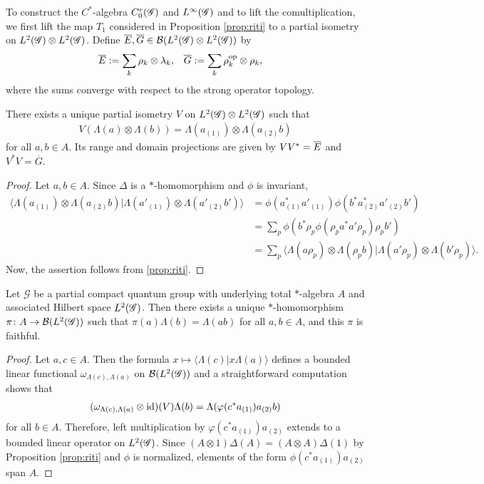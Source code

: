 To construct the $C^{*}$-algebra $C^{r}_{0}(\mathscr{G})$ and $L^{\infty}(\mathscr{G})$ and to lift the
comultiplication, we first lift the map $T_{1}$ considered in
Proposition \ref{prop:riti} to a partial isometry on $L^{2}(\mathscr{G}) \otimes
L^{2}(\mathscr{G})$.  Define $\overline{E},\overline{G} \in {\cal B}(L^{2}(\mathscr{G}) \otimes
L^{2}(\mathscr{G}))$ by
\begin{align*}
  \overline{E} &:=\sum_{k} \rho_{k} \otimes \lambda_{k}, & 
  \overline{G} &:= \sum_{k} \rho_{k}^{\operatorname{\mathrm{op}}} \otimes \rho_{k},
\end{align*}
where the sums converge with respect to the strong operator
topology.
\begin{Lem} \label{lemma:partial-isometry}
There exists a unique partial isometry $V$ on $L^{2}(\mathscr{G}) \otimes L^{2}(\mathscr{G})$
such that
\begin{align*}
  V(\Lambda(a) \otimes \Lambda(b)) = \Lambda(a_{(1)}) \otimes \Lambda(a_{(2)}b)
\end{align*}
for all $a,b\in A$. Its range and domain projections are given by $VV^{*} = \overline{E}$
and $V^{*}V = \overline{G}$.
\end{Lem}
\begin{proof}
  Let $a,b \in A$. Since $\Delta$ is a $*$-homomorphism and $\phi$ is
invariant,
  \begin{align*}
    \langle \Lambda(a_{(1)}) \otimes
    \Lambda(a_{(2)}b)|\Lambda(a'_{(1)}) \otimes
    \Lambda(a'_{(2)}b')\rangle &=
    \phi(a_{(1)}^{*}a'_{(1)})\phi(b^{*}a_{(2)}^{*}a'_{(2)}b') \\
    &= \sum_{p}
    \phi(b^{*}\rho_{p}\phi(\rho_{p}a^{*}a'\rho_{p})\rho_{p}b') \\
    & =\sum_{p} \langle\Lambda(a\rho_{p}) \otimes \Lambda(\rho_{p}b) |
    \Lambda(a'\rho_{p}) \otimes \Lambda(b'\rho_{p})\rangle.
  \end{align*}
  Now, the assertion follows from \ref{prop:riti}.
\end{proof}

\begin{Prop} \label{prop:gns} Let $\mathscr{G}$ be a partial compact quantum group with
  underlying total $*$-algebra $A$ and associated Hilbert
  space $L^{2}(\mathscr{G})$. Then there exists a unique $*$-homomorphism $\pi\colon
  A \to {\cal B}(L^{2}(\mathscr{G}))$ such that $\pi(a)\Lambda(b)=\Lambda(ab)$ for
  all $a,b\in A$, and this $\pi$ is faithful.
\end{Prop}
\begin{proof} 
  Let $a,c \in A$. Then the formula $x \mapsto \langle
\Lambda(c) | x\Lambda(a)\rangle$ defines a bounded linear functional
  $\omega_{\Lambda(c),\Lambda(a)}$ on ${\cal B}(L^{2}(\mathscr{G}))$ and a
  straightforward computation shows that
  \begin{align*}
    (\omega_{\Lambda(c),\Lambda(a)}\otimes \operatorname{id})(V)\Lambda(b) =
    \Lambda(\varphi(c^*a_{(1)})a_{(2)}b)
  \end{align*}
  for all $b\in A$. Therefore, left multiplication by
  $\varphi(c^*a_{(1)})a_{(2)}$ extends to a bounded linear operator on $L^{2}(\mathscr{G})$.
 Since $(A\otimes 1)\Delta(A) = (A\otimes
  A)\Delta(1)$ by Proposition \ref{prop:riti} and $\phi$ is
  normalized,  elements of the form $\phi(c^{*}a_{(1)})a_{(2)}$ span
  $A$. 
\end{proof}

